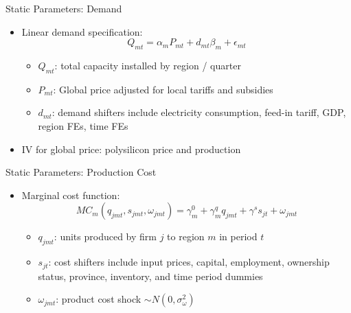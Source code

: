 \documentclass[xcolor=dvipsnames,envcountsect]{beamer}
\begin{document}


\begin{frame}{Static Parameters: Demand}
    \begin{itemize}
    \item Linear demand specification:
    \[
    Q_{mt}=\alpha_{m} P_{mt}+d_{mt}\beta_{m}+\epsilon_{mt} \nonumber
    \]
        \begin{itemize}
        \item $Q_{mt}$: total capacity installed by region / quarter
        \item $P_{mt}$: Global price adjusted for local tariffs and subsidies
        \item $d_{mt}$: demand shifters include electricity consumption, feed-in tariff, GDP, region FEs, time FEs
        \end{itemize}
    \item IV for global price: polysilicon price and production
    \end{itemize}
\end{frame}

\begin{frame}{Static Parameters: Production Cost}
\begin{itemize}
     \item Marginal cost function:
    \begin{equation}
        MC_m(q_{jmt},s_{jmt},\omega_{jmt})=\gamma_{m}^0+\gamma_m^q q_{jmt}+\gamma^s s_{jt}+\omega_{jmt}  \nonumber
    \end{equation}

   \begin{itemize}
       \item $q_{jmt}$: units produced by firm $j$ to region $m$ in period $t$
       \item $s_{jt}$:  cost  shifters include  input prices, capital, employment, ownership status, province, inventory, and time period dummies
       \item $\omega_{jmt}$: product cost shock $\sim N(0,\sigma^2_\omega)$
   \end{itemize}
\end{itemize}
\end{frame}
\end{document}
